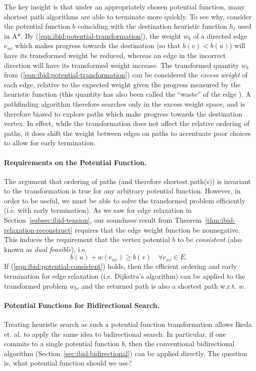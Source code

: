 The key insight is that under an appropriately chosen potential function,
many shortest path algorithms are able to terminate more quickly.
To see why,
consider the potential function $b$ coinciding with
the destination heuristic function $h_t$ used in A*.
By (\ref{eqn:ibid:potential-transformation}),
the weight $w_b$ of a directed edge $e_{uv}$ which makes
progress towards the destination (so that $b(v) < b(u)$)
will have its transformed weight be reduced,
whereas an edge in the incorrect direction will have its transformed
weight increase.
The transformed quantity $w_b$
from (\ref{eqn:ibid:potential-transformation})
can be considered the \emph{excess weight} of each edge,
relative to the expected weight given the progress measured by the
heuristic function
(this quantity has also been called the ``waste'' of the edge
\citep{pohl1969bidirectional}).
A pathfinding algorithm therefore searches only in the excess weight
space,
and is therefore biased to explore paths which make progress towards
the destination vertex.
In effect,
while the transformation does not affect the relative ordering of
paths,
it does shift the weight between edges on paths to accentuate poor
choices to allow for early termination.

\paragraph{Requirements on the Potential Function.}
The argument that ordering of paths (and therefore shortest path(s))
is invariant to the transformation is true for any arbitrary
potential function.
However,
in order to be useful,
we must be able to solve the transformed problem efficiently
(i.e. with early termination).
As we saw for edge relaxation in Section~\ref{subsec:ibid-tension},
our soundness result from Theorem~\ref{thm:ibid-relaxation-reconstruct}
requires that the edge weight function be nonnegative.
This induces the requirement that
the vertex potential $b$ to be \emph{consistent}
(also known as \emph{dual feasible}), i.e.
\begin{equation}
   b(u) + w(e_{uv}) \geq b(v) \quad\forall e_{uv} \in E.
   \label{eqn:ibid:potential-consistent}
\end{equation}
If (\ref{eqn:ibid:potential-consistent}) holds,
then the efficient ordering and early termination
for edge relaxation (i.e. Dijkstra's algorithm)
can be applied to the transformed problem $w_b$,
and the returned path is also a shortest path w.r.t. $w$. 

\paragraph{Potential Functions for Bidirectional Search.}
Treating heuristic search as such a potential function transformation
allows Ikeda et. al. \citep{ikeda1994betterroutes} to apply
the same idea to bidirectional search.
In particular,
if one commits to a single potential function $b$,
then the conventional bidirectional algorithm
(Section~\ref{sec:ibid:bidirectional})
can be applied directly.
The question is,
what potential function should we use?

